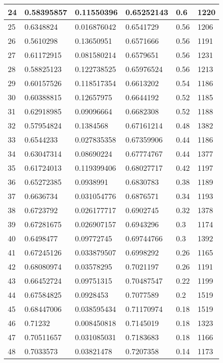 \begin{longtable}{|l|l|l|l|l|l|}
24 & 0.58395857 & 0.11550396 & 0.65252143 & 0.6 & 1220 \\ \hline 
25 & 0.6348824 & 0.016876042 & 0.6541729 & 0.56 & 1206 \\ \hline 
26 & 0.5610298 & 0.13650951 & 0.6571666 & 0.56 & 1191 \\ \hline 
27 & 0.61172915 & 0.081580214 & 0.6579651 & 0.56 & 1231 \\ \hline 
28 & 0.58825123 & 0.122738525 & 0.65976524 & 0.56 & 1213 \\ \hline 
29 & 0.60157526 & 0.118517354 & 0.6613202 & 0.54 & 1186 \\ \hline 
30 & 0.60388815 & 0.12657975 & 0.6644192 & 0.52 & 1185 \\ \hline 
31 & 0.62918985 & 0.09096664 & 0.6682308 & 0.52 & 1188 \\ \hline 
32 & 0.57954824 & 0.1384568 & 0.67161214 & 0.48 & 1382 \\ \hline 
33 & 0.6544233 & 0.027835358 & 0.67359906 & 0.44 & 1186 \\ \hline 
34 & 0.63047314 & 0.08690224 & 0.67774767 & 0.44 & 1377 \\ \hline 
35 & 0.61724013 & 0.119399406 & 0.68027717 & 0.42 & 1197 \\ \hline 
36 & 0.65272385 & 0.0938991 & 0.6830783 & 0.38 & 1189 \\ \hline 
37 & 0.6636734 & 0.031054776 & 0.6876571 & 0.34 & 1193 \\ \hline 
38 & 0.6723792 & 0.026177717 & 0.6902745 & 0.32 & 1378 \\ \hline 
39 & 0.67281675 & 0.026907157 & 0.6943296 & 0.3 & 1174 \\ \hline 
40 & 0.6498477 & 0.09772745 & 0.69744766 & 0.3 & 1392 \\ \hline 
41 & 0.67245126 & 0.033879507 & 0.6998292 & 0.26 & 1165 \\ \hline 
42 & 0.68080974 & 0.03578295 & 0.7021197 & 0.26 & 1191 \\ \hline 
43 & 0.66452724 & 0.09751315 & 0.70487547 & 0.22 & 1199 \\ \hline 
44 & 0.67584825 & 0.0928453 & 0.7077589 & 0.2 & 1519 \\ \hline 
45 & 0.68447006 & 0.038595434 & 0.71170974 & 0.18 & 1519 \\ \hline 
46 & 0.71232 & 0.008450818 & 0.7145019 & 0.18 & 1323 \\ \hline 
47 & 0.70511657 & 0.031085031 & 0.7183683 & 0.18 & 1166 \\ \hline 
48 & 0.7033573 & 0.03821478 & 0.7207358 & 0.14 & 1173 \\ \hline 

\end{longtable}
